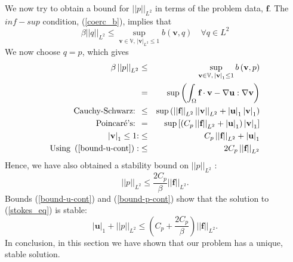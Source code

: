\documentclass[12pt,a4paper]{article}
\theoremstyle{definition}
\begin{document}
We now try to obtain a bound for $\left|\left|p\right|\right|_{L^2}$ in terms of the problem data, $\textbf{f}$.  The $inf-sup$ condition, (\ref{coerc_b}), implies that
\begin{equation}\nonumber
\beta \left|\left|q\right|\right|_{L^2}\leq \sup_{\textbf{v}\in \mathbb{V}, \,\left|\textbf{v}\right|_{L^2}\leq1}  b\left(\textbf{v},q\right)\quad  \forall q \in L^2
\end{equation}
We now choose $q=p$, which gives 
\begin{eqnarray}\nonumber
\beta \left|\left|p\right|\right|_{L^2} &\leq& \sup_{\textbf{v}\in \mathbb{V}, \,\left|\textbf{v}\right|_1\leq1}  b\left(\textbf{v},p\right)\\\nonumber
&=& \sup \left(\int_{\Omega}\textbf{f}\cdot\textbf{v} -\nabla\textbf{u}:\nabla\textbf{v}\right)\\\nonumber
\text{Cauchy-Schwarz: }&\leq& \sup \left(\left|\left|\textbf{f}\right| \right|_{L^2} \left|\left|\textbf{v}\right|\right|_{L^2}+\left|\textbf{u}\right|_1 \left|\textbf{v}\right|_1\right)\\\nonumber
\text{Poincar\'e's: }&=&\sup \left[\left(C_p\left|\left|\textbf{f}\right| \right|_{L^2}+ \left|\textbf{u}\right|_1\right) \left|\textbf{v}\right|_1\right] \\\nonumber
\left|\textbf{v}\right|_1\leq 1\text{:} &\leq&C_p\left|\left|\textbf{f}\right| \right|_{L^2}+ \left|\textbf{u}\right|_1\\\nonumber
\text{Using }\left(\ref{bound-u-cont}\right):&\leq&2C_p\left|\left|\textbf{f}\right| \right|_{L^2}
\end{eqnarray}
Hence, we have also obtained a stability bound on $\left|\left|p\right|\right|_{L^2}$ :
\begin{equation}\label{bound-p-cont}
\left|\left|p\right|\right|_{L^2} \leq \frac{2C_p}{\beta}\left|\left|\textbf{f}\right|\right|_{L^2}.
\end{equation}
Bounds (\ref{bound-u-cont}) and (\ref{bound-p-cont}) show that the solution to (\ref{stokes_eq}) is stable:
\begin{equation}
\left|\textbf{u}\right|_1+\left|\left|p\right|\right|_{L^2} \leq\left( C_p+\frac{2C_p}{\beta}\right)\left|\left|\textbf{f}\right|\right|_{L^2}.
\end{equation}
In conclusion, in this section we have shown that our problem has a unique, stable solution.
\end{document}
